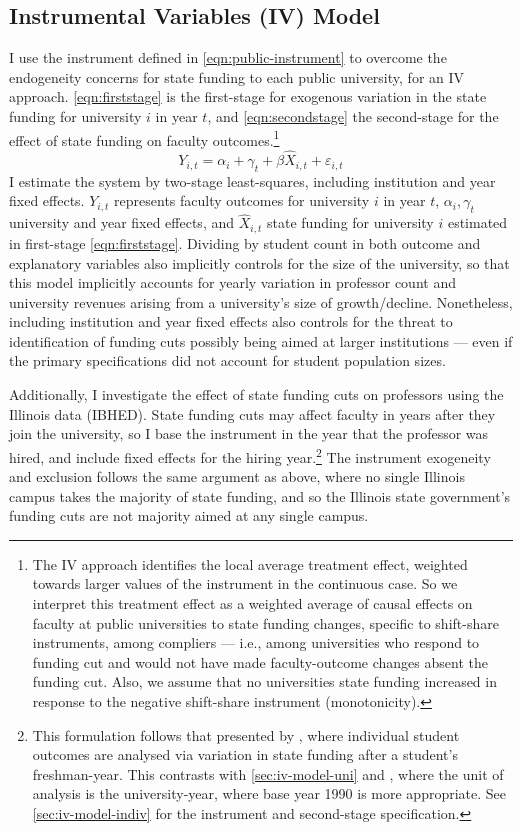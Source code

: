 \subsection{Instrumental Variables (IV) Model}
\label{sec:iv-model-uni}
I use the instrument defined in \autoref{eqn:public-instrument} to overcome the endogeneity concerns for state funding to each public university, for an IV approach.
\autoref{eqn:firststage} is the first-stage for exogenous variation in the state funding for university $i$ in year $t$, and \autoref{eqn:secondstage} the second-stage for the effect of state funding on faculty outcomes.\footnote{
    The IV approach identifies the local average treatment effect, weighted towards larger values of the instrument in the continuous case.
    So we interpret this treatment effect as a weighted average of causal effects on faculty at public universities to state funding changes, specific to shift-share instruments, among compliers --- i.e., among universities who respond to funding cut and would not have made faculty-outcome changes absent the funding cut.
    Also, we assume that no universities state funding increased in response to the negative shift-share instrument (monotonicity).
}
\begin{equation}
    \label{eqn:secondstage}
    Y_{i,t} = \alpha_i + \gamma_t + \beta \widehat X_{i,t} + \varepsilon_{i,t}
\end{equation}
I estimate the system by two-stage least-squares, including institution and year fixed effects.
$Y_{i,t}$ represents faculty outcomes for university $i$ in year $t$, $\alpha_i, \gamma_t$ university and year fixed effects, and $\widehat X_{i,t}$ state funding for university $i$ estimated in first-stage \eqref{eqn:firststage}.
Dividing by student count in both outcome and explanatory variables also implicitly controls for the size of the university, so that this model implicitly accounts for yearly variation in professor count and university revenues arising from a university's size of growth/decline.
Nonetheless, including institution and year fixed effects also controls for the threat to identification of funding cuts possibly being aimed at larger institutions --- even if the primary specifications did not account for student population sizes.

Additionally, I investigate the effect of state funding cuts on professors using the Illinois data (IBHED).
State funding cuts may affect faculty in years after they join the university, so I base the instrument in the year that the professor was hired, and include fixed effects for the hiring year.\footnote{
    This formulation follows that presented by \cite{NBERw27885}, where individual student outcomes are analysed via variation in state funding after a student's freshman-year.
    This contrasts with \autoref{sec:iv-model-uni} and \cite{NBERw23736}, where the unit of analysis is the university-year, where base year 1990 is more appropriate.
    See \autoref{sec:iv-model-indiv} for the instrument and second-stage specification.
}
The instrument exogeneity and exclusion follows the same argument as above, where no single Illinois campus takes the majority of state funding, and so
the Illinois state government's funding cuts are not majority aimed at any single campus.

